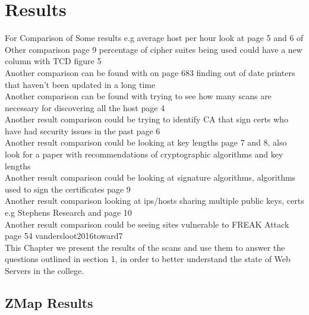 \documentclass[a4wide,leqno,12pt]{report}
\begin{document}
\chapter{Results}

For Comparison of Some results e.g average host per hour look at page 5 and 6 of \cite{durumeric2013zmap}\\

Other comparison \cite{durumeric2015search} page 9 percentage of cipher suites being used could have a new column with TCD figure 5\\

Another comparison can be found with \cite{lee2016implementation} on page 683 finding out of date printers that haven't been updated in a long time\\

Another comparison can be found with trying to see how many scans are necessary for discovering all the host \cite{durumeric2013analysis} page 4\\

Another result comparison could be trying to identify CA that sign certs who have had security issues in the past \cite{durumeric2013analysis} page 6\\

Another result comparison could be looking at key lengths \cite{durumeric2013analysis} page 7 and 8, also look for a paper with recommendations of cryptographic algorithms and key lengths\\

Another result comparison could be looking at signature algorithms, algorithms used to sign the certificates \cite{durumeric2013analysis} page 9\\

Another result comparison looking at ips/hosts sharing multiple public keys, certs e.g Stephens Research and \cite{durumeric2013analysis} page 10\\

Another result comparison could be seeing sites vulnerable to FREAK Attack \cite{vandersloot2016toward} page 54
vandersloot2016toward7\\


This Chapter we present the results of the scans and use them to answer the questions outlined in section 1, in order to better understand the state of Web Servers in the college.


\section{ZMap Results}
\end{document}
